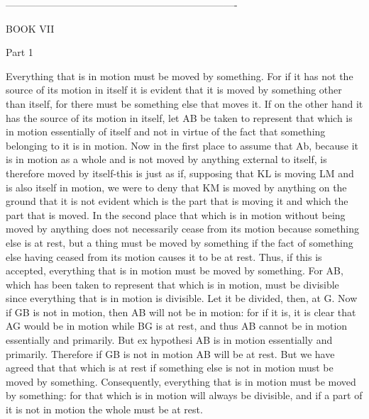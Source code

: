----------------------------------------------------------------------

BOOK VII

Part 1 

Everything that is in motion must be moved by something. For if it
has not the source of its motion in itself it is evident that it is
moved by something other than itself, for there must be something
else that moves it. If on the other hand it has the source of its
motion in itself, let AB be taken to represent that which is in motion
essentially of itself and not in virtue of the fact that something
belonging to it is in motion. Now in the first place to assume that
Ab, because it is in motion as a whole and is not moved by anything
external to itself, is therefore moved by itself-this is just as if,
supposing that KL is moving LM and is also itself in motion, we were
to deny that KM is moved by anything on the ground that it is not
evident which is the part that is moving it and which the part that
is moved. In the second place that which is in motion without being
moved by anything does not necessarily cease from its motion because
something else is at rest, but a thing must be moved by something
if the fact of something else having ceased from its motion causes
it to be at rest. Thus, if this is accepted, everything that is in
motion must be moved by something. For AB, which has been taken to
represent that which is in motion, must be divisible since everything
that is in motion is divisible. Let it be divided, then, at G. Now
if GB is not in motion, then AB will not be in motion: for if it is,
it is clear that AG would be in motion while BG is at rest, and thus
AB cannot be in motion essentially and primarily. But ex hypothesi
AB is in motion essentially and primarily. Therefore if GB is not
in motion AB will be at rest. But we have agreed that that which is
at rest if something else is not in motion must be moved by something.
Consequently, everything that is in motion must be moved by something:
for that which is in motion will always be divisible, and if a part
of it is not in motion the whole must be at rest. 


